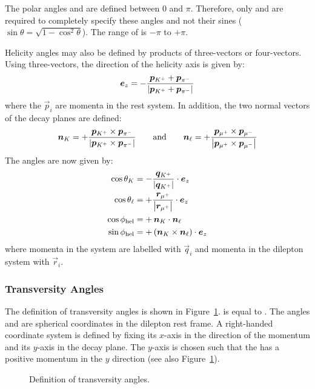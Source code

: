 The polar angles \thetak{} and \thetal{} are defined between 0 and $\pi$. Therefore, only
\cthetak{} and \cthetal{} are required to completely specify these angles and not their sines
($\sin\theta = \sqrt{1-\cos^2\theta}$). The range of \phihel{} is $-\pi$ to $+\pi$.

Helicity angles may also be defined by products of three-vectors or four-vectors. Using
three-vectors, the direction of the helicity axis is given by:
\begin{equation}
  \label{eq:helUnitVec}
  \vec{e}_z = -\frac{
    \vec{p}_{\kaon[+]} + \vec{p}_{\pion[-]}}{
    \left|\vec{p}_{\kaon[+]} + \vec{p}_{\pion[-]}\right|}
\end{equation}
where the $\vec{p}_i$ are momenta in the \B[][0] rest system. In addition, the two normal vectors
of the decay planes are defined:
\begin{equation}
  \label{eq:decPlaneNorms}
  \vec{n}_K = +\frac{
    \vec{p}_{\kaon[+]} \times \vec{p}_{\pion[-]}}{
    \left|\vec{p}_{\kaon[+]} \times \vec{p}_{\pion[-]}\right|}
  \qquad\text{and}\qquad
  \vec{n}_\ell = +\frac{
    \vec{p}_{\muon[+]} \times \vec{p}_{\muon[-]}}{
    \left|\vec{p}_{\muon[+]} \times \vec{p}_{\muon[-]}\right|}
\end{equation}
The angles are now given by:
\begin{equation}
  \label{eq:helAngles}
  \begin{split}
    \cthetak     &= -\frac{\vec{q}_{\kaon[+]}}{\left|\vec{q}_{\kaon[+]}\right|}
                     \cdot \vec{e}_z  \\
    \cthetal     &= +\frac{\vec{r}_{\muon[+]}}{\left|\vec{r}_{\muon[+]}\right|}
                     \cdot \vec{e}_z  \\
    \cos\phihel  &= +\,\vec{n}_K \cdot \vec{n}_\ell  \\
    \sin\phihel  &= +\left(\vec{n}_K \times \vec{n}_\ell\right) \cdot \vec{e}_z
  \end{split}
\end{equation}
where momenta in the \Kst{} system are labelled with $\vec{q}_i$ and momenta in the dilepton
system with $\vec{r}_i$.

\subsubsection{Transversity Angles} \label{sec:transAngles}
The definition of transversity angles is shown in Figure~\ref{fig:transFrame}. \psitr{} is
equal to \thetak. The angles \thetatr{} and \phitr{} are spherical coordinates in the dilepton
rest frame. A right-handed coordinate system is defined by fixing its $x$-axis in the direction of
the \B[][0] momentum and its $y$-axis in the \Kst{} decay plane. The $y$-axis is chosen such that
the \kaon[+] has a positive momentum in the $y$ direction (see also Figure~\ref{fig:transFrame}).
\begin{figure}[htbp]
  \centering
  \resizebox{\textwidth}{!}{}
  \caption{Definition of transversity angles.}
  \label{fig:transFrame}
\end{figure}

